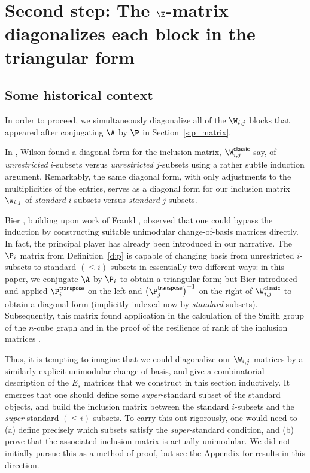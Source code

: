 \section{Second step:  The \texorpdfstring{$\E$}{E}-matrix diagonalizes each block in the triangular form}\label{s:e_matrix}

\subsection{Some historical context}

In order to proceed, we simultaneously diagonalize all of the $\W_{i,j}$ blocks that appeared after conjugating $\A$ by $\P$ in Section~\ref{s:p_matrix}. 

In \cite{wilson_classic}, Wilson found a diagonal form for the inclusion matrix, $\W^{\mathsf{classic}}_{i,j}$ say, of {\em unrestricted} $i$-subsets versus {\em unrestricted} $j$-subsets using a rather subtle induction argument.  Remarkably, the same diagonal form, with only adjustments to the multiplicities of the entries, serves as a diagonal form for our inclusion matrix $\W_{i,j}$ of {\em standard} $i$-subsets versus {\em standard} $j$-subsets.

Bier \cite{bier}, building upon work of Frankl \cite{frankl}, observed that one could bypass the induction by constructing suitable unimodular change-of-basis matrices directly.  In fact, the principal player has already been introduced in our narrative.  The $\P_i$ matrix from Definition~\ref{d:p} is capable of changing basis from unrestricted $i$-subsets to standard $(\leq i)$-subsets in essentially two different ways:  in this paper, we conjugate $\A$ by $\P_i$ to obtain a triangular form; but Bier introduced and applied $\P_i^{\mathsf{transpose}}$ on the left and $\left(\P_j^{\mathsf{transpose}}\right)^{-1}$ on the right of $\W^{\mathsf{classic}}_{i,j}$ to obtain a diagonal form (implicitly indexed now by {\em standard} subsets).  Subsequently, this matrix found application in the calculation of the Smith group of the $n$-cube graph \cite{hypercube} and in the proof of the resilience of rank of the inclusion matrices \cite{resilience}.

Thus, it is tempting to imagine that we could diagonalize our $\W_{i,j}$ matrices by a similarly explicit unimodular change-of-basis, and give a combinatorial description of the $E_s$ matrices that we construct in this section inductively.  It emerges that one should define some {\em super}-standard subset of the standard objects, and build the inclusion matrix between the standard $i$-subsets and the {\em super}-standard $(\leq i)$-subsets.  To carry this out rigorously, one would need to (a) define precisely which subsets satisfy the {\em super}-standard condition, and (b) prove that the associated inclusion matrix is actually unimodular.  We did not initially pursue this as a method of proof, but see the Appendix for results in this direction.


